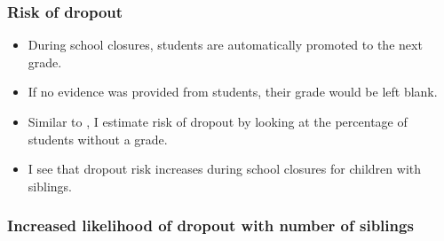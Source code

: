 \documentclass{beamer}
\begin{document}
 \begin{frame}
            \label{frame:dropout_risk_intro}
            \frametitle{Risk of dropout}
       \begin{itemize}
           \item During school closures, students are automatically promoted to the next grade.
           \item If no evidence was provided from students, their grade would be left blank.
           \item Similar to \cite{lichand_impacts_2021}, I estimate risk of dropout by looking at the percentage of students without a grade.
           \item I see that dropout risk increases during school closures for children with siblings.
       \end{itemize}
    \end{frame} 


    \begin{frame}
            \label{frame:dropout_risk}
            \frametitle{Increased likelihood of dropout with number of siblings}
        {
    }   %
   
    \end{frame}   
\end{document}

